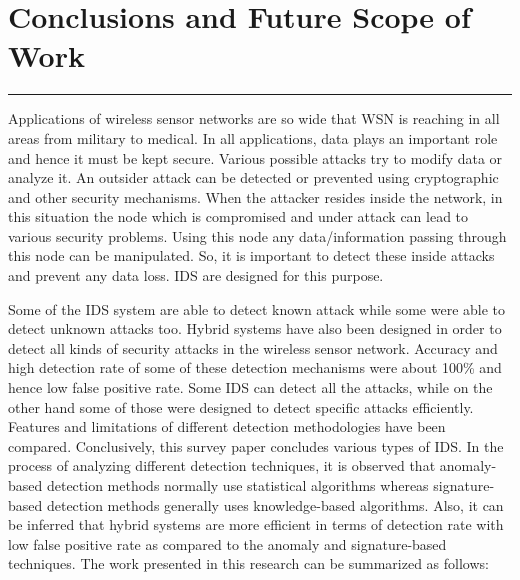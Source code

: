 \chapter{Conclusions and Future Scope of Work}
\label{C7} %
\noindent\rule{\linewidth}{2pt}
Applications of wireless sensor networks are so wide that WSN is reaching in all areas from military to medical. In all applications, data plays an important role and hence it must be kept secure. Various possible attacks try to modify data or analyze it. An outsider attack can be detected or prevented using cryptographic and other security mechanisms. When the attacker resides inside the network, in this situation the node which is compromised and under attack can lead to various security problems. Using this node any data/information passing through this node can be manipulated. So, it is important to detect these inside attacks and prevent any data loss. IDS are designed for this purpose.
\par Some of the IDS system are able to detect known attack while some were able to detect unknown attacks too. Hybrid systems have also been designed in order to detect all kinds of security attacks in the wireless sensor network. Accuracy and high detection rate of some of these detection mechanisms were about 100\% and hence low false positive rate. Some IDS can detect all the attacks, while on the other hand some of those were designed to detect specific attacks efficiently. Features and limitations of different detection methodologies have been compared. Conclusively, this survey paper concludes various types of IDS. In the process of analyzing different detection techniques, it is observed that anomaly-based detection methods normally use statistical algorithms whereas signature-based detection methods generally uses knowledge-based algorithms. Also, it can be inferred that hybrid systems are more efficient in terms of detection rate with low false positive rate as compared to the anomaly and signature-based techniques. The work presented in this research can be summarized as follows:
